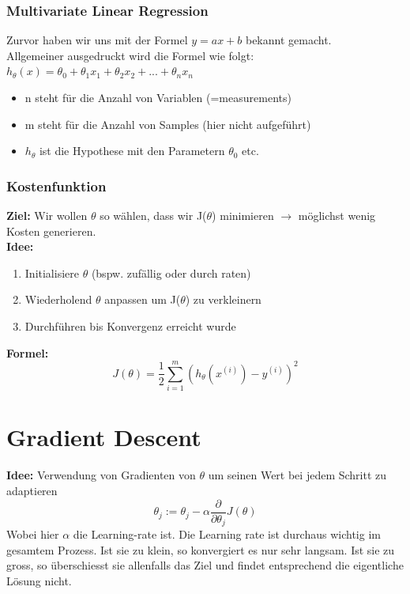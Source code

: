\documentclass{article}
\theoremstyle{merke}
\theoremstyle{definition}
\begin{document}
            \subsubsection{Multivariate Linear Regression}
            Zurvor haben wir uns mit der Formel $y = ax + b$ bekannt gemacht.\\
            
            Allgemeiner ausgedruckt wird die Formel wie folgt: $h_{\theta}(x) = \theta_0 + \theta_1 x_1 + \theta_2 x_2 + ... + \theta_n x_n$
            \begin{itemize}
                \item n steht für die Anzahl von Variablen (=measurements)
                \item m steht für die Anzahl von Samples (hier nicht aufgeführt)
                \item $h_{\theta}$ ist die Hypothese mit den Parametern $\theta_0$ etc.
            \end{itemize}
            
                    \subsubsection{Kostenfunktion}
            \textbf{Ziel:} Wir wollen $\theta$ so wählen, dass wir J($\theta$) minimieren $\rightarrow$ möglichst wenig Kosten generieren.\\
            \textbf{Idee:}
            \begin{enumerate}
                \item Initialisiere $\theta$ (bspw. zufällig oder durch raten)
                \item Wiederholend $\theta$ anpassen um J($\theta$) zu verkleinern
                \item Durchführen bis Konvergenz erreicht wurde
            \end{enumerate}
            \textbf{Formel:}
            \begin{equation}
                J(\theta) = \frac{1}{2} \sum^m_{i=1} (h_{\theta}(x^{(i)}) - y^{(i)})^2 
            \end{equation}

    
    \section{Gradient Descent}
    \textbf{Idee:} Verwendung von Gradienten von $\theta$ um seinen Wert bei jedem Schritt zu adaptieren
    \begin{equation}
        \theta_j := \theta_j - \alpha \frac{\partial}{\partial \theta_j} J(\theta)
    \end{equation}
    Wobei hier $\alpha$ die Learning-rate ist. Die Learning rate ist durchaus wichtig im gesamtem Prozess. Ist sie zu klein, so konvergiert es nur sehr langsam. Ist sie zu gross, so überschiesst sie allenfalls das Ziel und findet entsprechend die eigentliche Lösung nicht.
\end{document}
